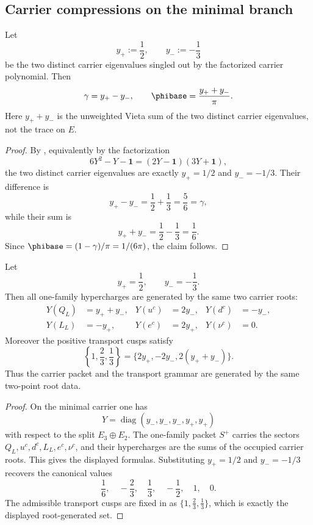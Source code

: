 \subsection{Carrier compressions on the minimal branch}

\begin{corollary}
Let
\[
y_+:=\frac12,
\qquad
y_-:=-\frac13
\]
be the two distinct carrier eigenvalues singled out by the factorized carrier polynomial. Then
\[
\gamma=y_+-y_-,
\qquad
\phibase=\frac{y_++y_-}{\pi}.
\]
Here $y_++y_-$ is the unweighted Vieta sum of the two distinct carrier eigenvalues, not the trace on $E$.
\end{corollary}

\begin{proof}
By , equivalently by the factorization
\[
6Y^2-Y-\mathbf 1=(2Y-\mathbf 1)(3Y+\mathbf 1),
\]
the two distinct carrier eigenvalues are exactly $y_+=1/2$ and $y_-=-1/3$. Their difference is
\[
y_+-y_-=\frac12+\frac13=\frac56=\gamma,
\]
while their sum is
\[
y_++y_-=\frac12-\frac13=\frac16.
\]
Since $\phibase=(1-\gamma)/\pi=1/(6\pi)$, the claim follows.
\end{proof}

\begin{proposition}
\label{prop:dual-root-generation}
Let
\[
y_+=\frac12,
\qquad
y_-=-\frac13.
\]
Then all one-family hypercharges are generated by the same two carrier roots:
\[
\begin{aligned}
Y(Q_L)&=y_++y_-,
&
Y(u^c)&=2y_-,
&
Y(d^c)&=-y_-,
\\
Y(L_L)&=-y_+,
&
Y(e^c)&=2y_+,
&
Y(\nu^c)&=0.
\end{aligned}
\]
Moreover the positive transport cusps satisfy
\[
\left\{1,\frac23,\frac13\right\}=\{2y_+,-2y_-,2(y_++y_-)\}.
\]
Thus the carrier packet and the transport grammar are generated by the same two-point root data.
\end{proposition}

\begin{proof}
On the minimal carrier one has
\[
Y=\operatorname{diag}(y_-,y_-,y_-,y_+,y_+)
\]
with respect to the split $E_3\oplus E_2$. The one-family packet $S^+$ carries the sectors
$Q_L,u^c,d^c,L_L,e^c,\nu^c$, and their hypercharges are the sums of the occupied carrier roots.
This gives the displayed formulas. Substituting $y_+=1/2$ and $y_-=-1/3$ recovers the canonical
values
\[
\frac16,\quad
-\frac23,\quad
\frac13,\quad
-\frac12,\quad
1,\quad
0.
\]
The admissible transport cusps are fixed in  as
$\{1,\frac23,\frac13\}$, which is exactly the displayed root-generated set.
\end{proof}

